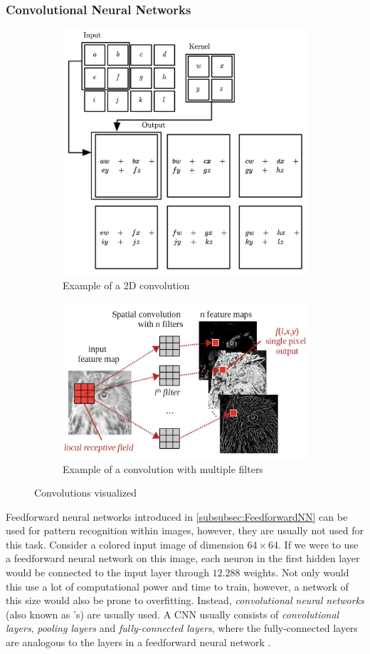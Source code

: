 \documentclass[./main.tex]{subfiles}
\begin{document}
\subsubsection{Convolutional Neural Networks} \label{subsubsec:CNN}
\begin{figure}[htbp]
    \centering
    \begin{subfigure}[t]{0.4\textwidth}
        \centering
        \includegraphics[height = 6 cm]{entities/2d_convolution_example.png}
        \caption{Example of a 2D convolution \cite{DeepLearning}}
    \end{subfigure}
    \begin{subfigure}[t]{0.4\textwidth}
        \centering
        \includegraphics[height = 5 cm]{entities/3d_convolution_example.png}
        \caption{Example of a convolution with multiple filters \cite{Everything}}
    \end{subfigure}
    \caption{Convolutions visualized}
    \label{fig:convolutionexample}
\end{figure}
Feedforward neural networks introduced in \ref{subsubsec:FeedforwardNN} can be used for pattern recognition within images, however, they are usually not used for this task. Consider a colored input image of dimension $64 \times 64$. If we were to use a feedforward neural network on this image, each neuron in the first hidden layer would be connected to the input layer through $12.288$ weights. Not only would this use a lot of computational power and time to train, however, a network of this size would also be prone to overfitting. Instead, \textit{convolutional neural networks} (also known as 's) are usually used. A CNN usually consists of \textit{convolutional layers}, \textit{pooling layers} and \textit{fully-connected layers}, where the fully-connected layers are analogous to the layers in a feedforward neural network \cite{CNN}.
\end{document}
